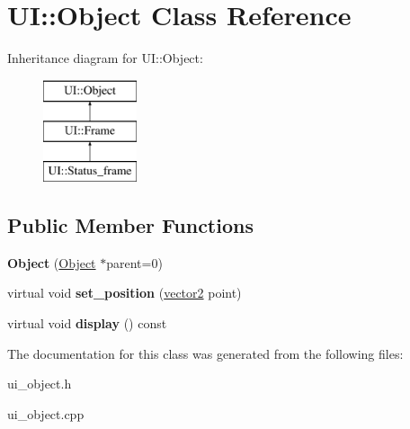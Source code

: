 \hypertarget{class_u_i_1_1_object}{
\section{UI::Object Class Reference}
\label{class_u_i_1_1_object}
}
Inheritance diagram for UI::Object:\begin{figure}[H]
\begin{center}
\leavevmode
\includegraphics[height=3.000000cm]{class_u_i_1_1_object}
\end{center}
\end{figure}
\subsection*{Public Member Functions}
\begin{DoxyCompactItemize}
\item 
\hypertarget{class_u_i_1_1_object_acca607e825b179397cf0f740c448c9f3}{
{\bfseries Object} (\hyperlink{class_u_i_1_1_object}{Object} $\ast$parent=0)}
\label{class_u_i_1_1_object_acca607e825b179397cf0f740c448c9f3}

\item 
\hypertarget{class_u_i_1_1_object_af6af620b2a212bc9aae86aeaf28782df}{
virtual void {\bfseries set\_\-position} (\hyperlink{classvector2d}{vector2} point)}
\label{class_u_i_1_1_object_af6af620b2a212bc9aae86aeaf28782df}

\item 
\hypertarget{class_u_i_1_1_object_a5ed9373e1a2187d05579f9c9e45ae92b}{
virtual void {\bfseries display} () const }
\label{class_u_i_1_1_object_a5ed9373e1a2187d05579f9c9e45ae92b}

\end{DoxyCompactItemize}


The documentation for this class was generated from the following files:\begin{DoxyCompactItemize}
\item 
ui\_\-object.h\item 
ui\_\-object.cpp\end{DoxyCompactItemize}
